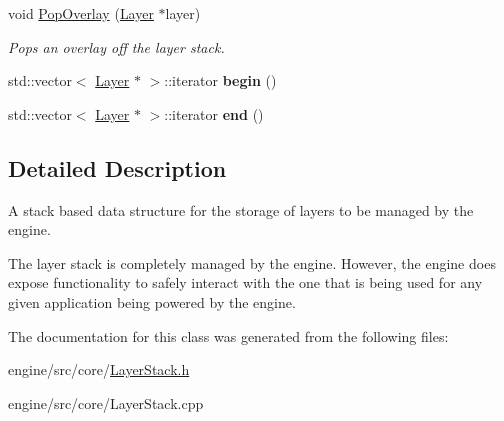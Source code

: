 \begin{DoxyCompactItemize}
\mbox{\label{classengine_1_1LayerStack_a9fe9370bb2a2b65561ea5ef998213510}} 
void \hyperlink{classengine_1_1LayerStack_a9fe9370bb2a2b65561ea5ef998213510}{Pop\+Overlay} (\hyperlink{classengine_1_1Layer}{Layer} $\ast$layer)
\begin{DoxyCompactList}\small\item\em Pops an overlay off the layer stack. \end{DoxyCompactList}\item 
\mbox{\label{classengine_1_1LayerStack_a341bf522aa1af78ba06e3fdf510df271}} 
std\+::vector$<$ \hyperlink{classengine_1_1Layer}{Layer} $\ast$ $>$\+::iterator {\bfseries begin} ()
\item 
\mbox{\label{classengine_1_1LayerStack_ad05cf0f1deec9dd7f7d8ead15febf657}} 
std\+::vector$<$ \hyperlink{classengine_1_1Layer}{Layer} $\ast$ $>$\+::iterator {\bfseries end} ()
\end{DoxyCompactItemize}


\subsection{Detailed Description}
A stack based data structure for the storage of layers to be managed by the engine. 

The layer stack is completely managed by the engine. However, the engine does expose functionality to safely interact with the one that is being used for any given application being powered by the engine. 

The documentation for this class was generated from the following files\+:\begin{DoxyCompactItemize}
\item 
engine/src/core/\hyperlink{LayerStack_8h}{Layer\+Stack.\+h}\item 
engine/src/core/Layer\+Stack.\+cpp\end{DoxyCompactItemize}

